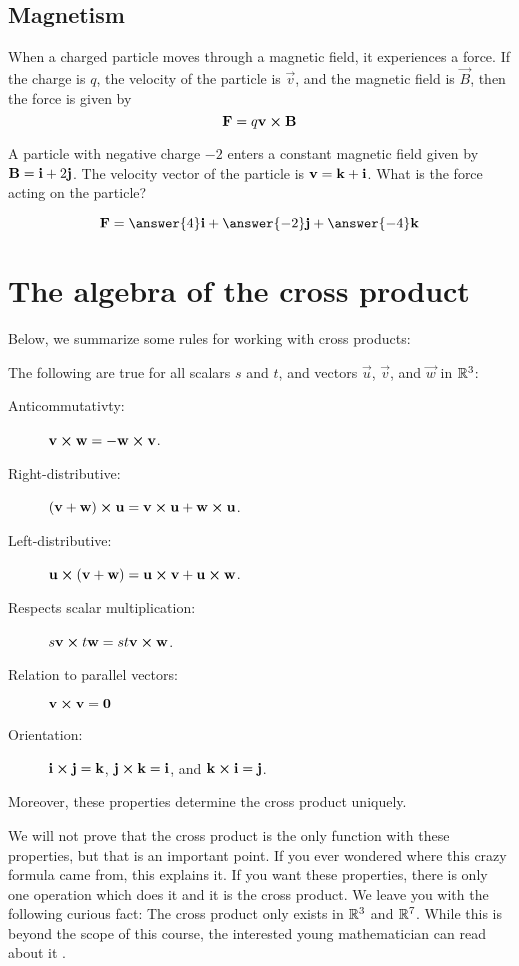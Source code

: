 \documentclass{ximera}
\begin{document}
\subsection{Magnetism} 

When a charged particle moves through a magnetic field, it experiences
a force.  If the charge is $q$, the velocity of the particle is
$\vec{v}$, and the magnetic field is $\vec{B}$, then the force is
given by
\[
\mathbf{F} = q\mathbf{v} \boldsymbol\times \mathbf{B}
\]

\begin{question}
  A particle with negative charge $-2$ enters a constant magnetic
  field given by $\mathbf{B} = \mathbf{i}+2\mathbf{j}$.  The velocity vector of
  the particle is $\mathbf{v} = \mathbf{k}+\mathbf{i}$.  What is the force
  acting on the particle?
  \begin{prompt}
  \[
  \vec{F} = \answer{4}\veci+\answer{-2}\vecj+\answer{-4}\veck
  \]
  \end{prompt}
\end{question}


\section{The algebra of the cross product}


Below, we summarize some rules for working with cross products:

\begin{theorem}  The following are true for all scalars $s$ and $t$,  and vectors
  $\vec{u}$, $\vec{v}$, and $\vec{w}$ in $\mathbb R^3$:
  \begin{description}
  \item[Anticommutativty:] $\mathbf{v} \boldsymbol\times \mathbf{w}  = -\mathbf{w} \boldsymbol\times \mathbf{v}$.
  \item[Right-distributive:] $(\mathbf{v}+\mathbf{w}) \boldsymbol\times \mathbf{u} = \mathbf{v} \boldsymbol\times \mathbf{u}+\mathbf{w} \boldsymbol\times \mathbf{u}$.
  \item[Left-distributive:] $\mathbf{u} \boldsymbol\times (\mathbf{v} +\mathbf{w}) = \mathbf{u} \boldsymbol\times \mathbf{v}+\mathbf{u}\boldsymbol\times\mathbf{w}$.
  \item[Respects scalar multiplication:] $s\mathbf{v} \boldsymbol\times t\mathbf{w} = st \mathbf{v} \boldsymbol\times \mathbf{w}$.
  \item[Relation to parallel vectors:] $\mathbf{v} \boldsymbol\times \mathbf{v} = \mathbf{0}$
  \item[Orientation:] $\mathbf{i} \boldsymbol\times \mathbf{j} = \mathbf{k}$, $\mathbf{j} \boldsymbol\times \mathbf{k} = \mathbf{i}$, and $\mathbf{k} \boldsymbol\times \mathbf{i} = \mathbf{j}$. 
  \end{description}
  Moreover, these properties determine the cross product uniquely.
\end{theorem}

We will not prove that the cross product is the only function with
these properties, but that is an important point.  If you ever
wondered where this crazy formula came from, this explains it.  If you
want these properties, there is only one operation which does it and
it is the cross product. We leave you with the following curious fact:
The cross product only exists in $\mathbb R^3$ and $\mathbb R^7$. While this is
beyond the scope of this course, the interested young mathematician can read about it .
\end{document}
